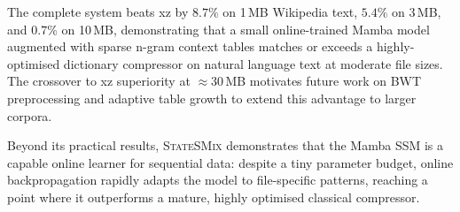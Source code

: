 \documentclass[10pt,twocolumn]{article}
\newcommand{\ssmcomp}{\textsc{StateSMix}}
\begin{document}
The complete system beats xz by $8.7\%$ on 1\,MB Wikipedia text,
$5.4\%$ on 3\,MB, and $0.7\%$ on 10\,MB, demonstrating that a small
online-trained Mamba model augmented with sparse n-gram context
tables matches or exceeds a highly-optimised dictionary compressor
on natural language text at moderate file sizes.  The crossover to
xz superiority at ${\approx}30$\,MB motivates future work on BWT
preprocessing and adaptive table growth to extend this advantage to
larger corpora.

Beyond its practical results, \ssmcomp{} demonstrates that the Mamba
SSM is a capable online learner for sequential data: despite a tiny
parameter budget, online backpropagation rapidly adapts the model to
file-specific patterns, reaching a point where it outperforms a mature,
highly optimised classical compressor.
\end{document}
